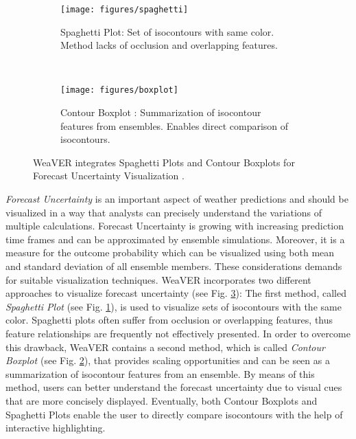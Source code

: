 \documentclass[citeauthoryear]{llncs}
\begin{document}
\begin{description}
	\begin{figure}[b]
		\vspace*{-0.5cm}
		\centering
		\begin{subfigure}[t]{0.5\textwidth}
			\centering
			\texttt{[image: figures/spaghetti]} 
			\caption{{\small Spaghetti Plot: Set of isocontours with same color. Method lacks of occlusion and overlapping features.}}
			\label{spaghetti}
		\end{subfigure}%
		~ 
		\begin{subfigure}[t]{0.5\textwidth}
			\centering
			\texttt{[image: figures/boxplot]} 
			\caption{{\small Contour Boxplot \cite{whitaker2013contour}: Summarization of isocontour features from ensembles. Enables direct comparison of isocontours. }}
			\label{boxplot}
		\end{subfigure}
		\vspace*{-0.2cm}
		\caption{{\small  WeaVER integrates Spaghetti Plots and Contour Boxplots for Forecast Uncertainty Visualization \cite{quinan2016visually}.\label{uncertainty}}}
		\vspace*{-0.8cm}
	\end{figure}
	\noindent \textit{Forecast Uncertainty} is an important aspect of weather predictions and should be visualized in a way that analysts can precisely understand the variations of multiple calculations. Forecast Uncertainty is growing with increasing prediction time frames and can be approximated by ensemble simulations. Moreover, it is a measure for the outcome probability which can be visualized using both mean and standard deviation of all ensemble members. These considerations demands for suitable visualization techniques. WeaVER incorporates two different approaches to visualize forecast uncertainty (see Fig. \ref{uncertainty}): The first method, called \textit{Spaghetti Plot} (see Fig. \ref{spaghetti}), is used to visualize sets of isocontours with the same color. Spaghetti plots often suffer from occlusion or overlapping features, thus feature relationships are frequently not effectively presented. In order to overcome this drawback, WeaVER contains a second method, which is called \textit{Contour Boxplot \cite{whitaker2013contour}} (see Fig. \ref{boxplot}), that provides scaling opportunities and can be seen as a summarization of isocontour features from an ensemble. By means of this method, users can better understand the forecast uncertainty due to visual cues that are more concisely displayed. Eventually, both Contour Boxplots and Spaghetti Plots enable the user to directly compare isocontours with the help of interactive highlighting.\\
	

\end{description}
\end{document}
